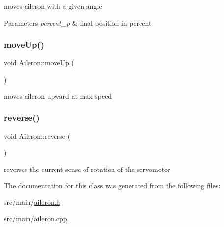 moves aileron with a given angle 


\begin{DoxyParams}{Parameters}
{\em percent\+\_\+p} & final position in percent \\
\hline
\end{DoxyParams}
\mbox{\label{class_aileron_abeee29a990a1a9b3d8bc884991b7221f}} 
\subsubsection{\texorpdfstring{move\+Up()}{moveUp()}}
{\footnotesize\ttfamily void Aileron\+::move\+Up (\begin{DoxyParamCaption}{ }\end{DoxyParamCaption})}



moves aileron upward at max speed 

\mbox{\label{class_aileron_a5d5579971f2679d708d01657d63da414}} 
\subsubsection{\texorpdfstring{reverse()}{reverse()}}
{\footnotesize\ttfamily void Aileron\+::reverse (\begin{DoxyParamCaption}{ }\end{DoxyParamCaption})}



reverses the current sense of rotation of the servomotor 



The documentation for this class was generated from the following files\+:\begin{DoxyCompactItemize}
\item 
src/main/\hyperlink{aileron_8h}{aileron.\+h}\item 
src/main/\hyperlink{aileron_8cpp}{aileron.\+cpp}\end{DoxyCompactItemize}
